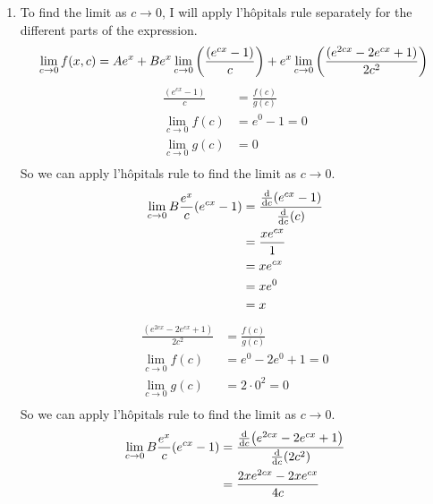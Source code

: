 \documentclass[10pt,\jkfside,a4paper]{article}
\begin{document}
\begin{enumerate}
\begin{enumerate}
\item
To find the limit as $c \rightarrow 0$, I will apply l'h\^opitals rule separately for the different parts of 
the expression.
\begin{equation}
\lim_{c \rightarrow 0} f(x, c) = Ae^x + Be^x\lim_{c\rightarrow 0}\left(\frac{(e^{cx} - 1)}{c}\right) + e^x\lim_{c \rightarrow 0}\left(\frac{(e^{2cx} - 2e^{cx} + 1)}{2c^2}\right)\\
\end{equation}
\begin{equation}
\begin{split}
\frac{(e^{cx} - 1)}{c} &= \frac{f(c)}{g(c)}\\
\lim_{c \rightarrow 0} f(c) &= e^0 - 1 = 0\\
\lim_{c \rightarrow 0} g(c) &= 0\\
\end{split}
\end{equation}
So we can apply l'h\^opitals rule to find the limit as $c \rightarrow 0$.
\begin{equation}
\begin{split}
\lim_{c \rightarrow 0} B\frac{e^x}{c}(e^{cx} - 1) &= \frac{\dv{c}(e^{cx} - 1)}{\dv{c}(c)} \\
												  &= \frac{xe^{cx}}{1} \\
												  &= xe^{cx}\\
												  &= xe^0\\
												  &= x\\
\end{split}
\end{equation}
\begin{equation}
\begin{split}
\frac{(e^{2cx} - 2e^{cx} + 1)}{2c^2} &= \frac{f(c)}{g(c)}\\
\lim_{c \rightarrow 0} f(c) &= e^0 - 2e^0 + 1 = 0\\
\lim_{c \rightarrow 0} g(c) &= 2 \cdot 0^2 = 0\\
\end{split}
\end{equation}
So we can apply l'h\^opitals rule to find the limit as $c \rightarrow 0$.
\begin{equation}
\begin{split}
\lim_{c \rightarrow 0} B\frac{e^x}{c}(e^{cx} - 1) &= \frac{\dv{c} (e^{2cx} - 2e^{cx} + 1)}{\dv{c} (2c^2)} \\
												  &= \frac{2xe^{2cx} - 2xe^{cx}}{4c}\\
\end{split}

\end{equation}
\end{enumerate}
\end{enumerate}
\end{document}
